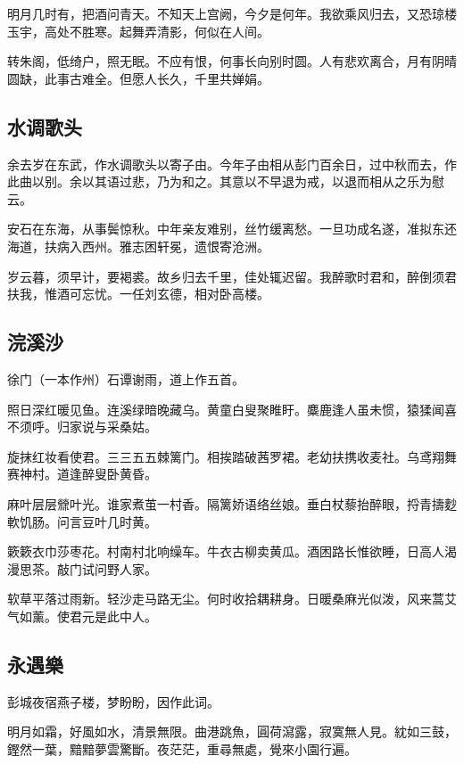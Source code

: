 \documentclass[a5paper]{ctexart}
\begin{document}
	明月几时有，把酒问青天。不知天上宫阙，今夕是何年。我欲乘风归去，又恐琼楼玉宇，高处不胜寒。起舞弄清影，何似在人间。
	
	转朱阁，低绮户，照无眠。不应有恨，何事长向别时圆。人有悲欢离合，月有阴晴圆缺，此事古难全。但愿人长久，千里共婵娟。　
	
	\subsection{水调歌头}
	\begin{small}
		余去岁在东武，作水调歌头以寄子由。今年子由相从彭门百余日，过中秋而去，作此曲以别。余以其语过悲，乃为和之。其意以不早退为戒，以退而相从之乐为慰云。
	\end{small}
	
	安石在东海，从事鬓惊秋。中年亲友难别，丝竹缓离愁。一旦功成名遂，准拟东还海道，扶病入西州。雅志困轩冕，遗恨寄沧洲。
	
	岁云暮，须早计，要褐裘。故乡归去千里，佳处辄迟留。我醉歌时君和，醉倒须君扶我，惟酒可忘忧。一任刘玄德，相对卧高楼。
	
	\subsection{浣溪沙}
	\begin{small}
		徐门（一本作州）石谭谢雨，道上作五首。
	\end{small}
	
	照日深红暖见鱼。连溪绿暗晚藏乌。黄童白叟聚睢盱。麋鹿逢人虽未惯，猿猱闻喜不须呼。归家说与采桑姑。
	
	旋抹红妆看使君。三三五五棘篱门。相挨踏破茜罗裙。老幼扶携收麦社。乌鸢翔舞赛神村。道逢醉叟卧黄昏。
	
	麻叶层层檾叶光。谁家煮茧一村香。隔篱娇语络丝娘。垂白杖藜抬醉眼，捋青擣麨軟饥肠。问言豆叶几时黄。
	
	簌簌衣巾莎枣花。村南村北响缲车。牛衣古柳卖黄瓜。酒困路长惟欲睡，日高人渴漫思茶。敲门试问野人家。　
	
	软草平落过雨新。轻沙走马路无尘。何时收拾耦耕身。日暖桑麻光似泼，风来蒿艾气如薰。使君元是此中人。　
	
	\subsection{永遇樂}
	\begin{small}
		彭城夜宿燕子楼，梦盼盼，因作此词。
	\end{small}
	
	明月如霜，好風如水，清景無限。曲港跳魚，圓荷瀉露，寂寞無人見。紞如三鼓，鏗然一葉，黯黯夢雲驚斷。夜茫茫，重尋無處，覺來小園行遍。
	
\end{document}
